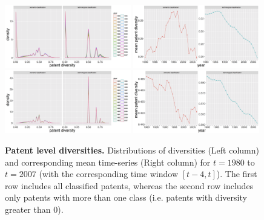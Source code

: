 \documentclass[12pt,twoside,a4paper]{article}
\begin{document}
\begin{figure}
\includegraphics[width=0.49\textwidth]{patentlevelorigs_all_semcounts}
\includegraphics[width=0.49\textwidth]{patentlevelorigs_all_ts_semcounts}\\
\includegraphics[width=0.49\textwidth]{patentlevelorigs_positive_semcounts}
\includegraphics[width=0.49\textwidth]{patentlevelorigs_positive_ts_semcounts}
\caption{
\textbf{Patent level diversities.} Distributions of diversities (Left column) and corresponding mean time-series (Right column) for $t=1980$ to $t=2007$ (with the corresponding time window $[t-4,t]$). The first row includes all classified patents, whereas the second row includes only patents with more than one class (i.e. patents with diversity greater than 0).
}
\label{fig:patent-level-orig}
\end{figure}
\end{document}
